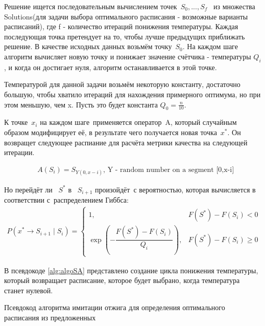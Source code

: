 Решение ищется последовательным вычислением точек {$S_0,...,S_f$ } из множества Solutions(для задачи выбора оптимального расписания - возможные варианты расписаний), где f - количество итераций понижения температуры. Каждая последующая точка претендует на то, чтобы лучше предыдущих приближать решение. В качестве исходных данных возьмём точку {$S_0$}. На каждом шаге алгоритм вычисляет новую точку и понижает значение счётчика - температуры {$Q_i$ }, и когда он достигает нуля, алгоритм останавливается в этой точке.

Температурой для данной задачи возьмём некоторую константу, достаточно большую, чтобы хватило итераций для нахождения примерного оптимума, но при этом меньшую, чем x. Пусть это будет константа {$Q_0 = \frac {n}{10}$}.

К точке {$x_i$} на каждом шаге применяется оператор A, который случайным образом модифицирует её, в результате чего получается новая точка {$x^*$}. Он возвращет следующее распиание для расчёта метрики качества на следующей итерации.

\begin{align}
	& A(S_i)= S_{Y(0, x-i)}\text{, Y - random number on a segment [0,x-i]}
\end{align}

Но перейдёт ли  {$S^*$} в  {$S_{i+1}$} произойдёт с вероятностью, которая вычисляется в соответствии с распределением Гиббса:
\begin{align}
P(x^*\to{S_{i+1}}\mid{S_i})=
\begin{cases}
	1, & F({S^*})-F({S_i})<0 \\
	\exp\left(-\dfrac{F(S^*)-F(S_i)}{Q_i}\right), & {F(S^*)-F(S_i)\geqslant 0}
\end{cases}
\end{align}

В псевдокоде \ref{alg:algoSA} представлено создание цикла понижения температуры, который возвращает расписание, которое будет выбрано, когда температура станет нулевой. 

\begin{algorithm} 
	\nonl{}
	\caption{Псевдокод алгоритма имитации отжига для определения оптимального расписания из предложенных}\label{alg:algoSA}
\end{algorithm} 

